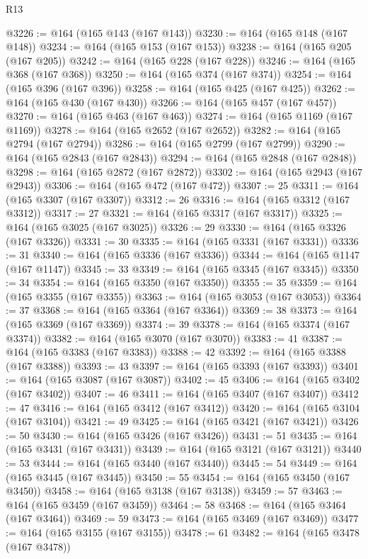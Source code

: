 \begin{lexlean}{R13}
\begin{coremodule}
@3226 := @164 (@165 @143 (@167 @143))
@3230 := @164 (@165 @148 (@167 @148))
@3234 := @164 (@165 @153 (@167 @153))
@3238 := @164 (@165 @205 (@167 @205))
@3242 := @164 (@165 @228 (@167 @228))
@3246 := @164 (@165 @368 (@167 @368))
@3250 := @164 (@165 @374 (@167 @374))
@3254 := @164 (@165 @396 (@167 @396))
@3258 := @164 (@165 @425 (@167 @425))
@3262 := @164 (@165 @430 (@167 @430))
@3266 := @164 (@165 @457 (@167 @457))
@3270 := @164 (@165 @463 (@167 @463))
@3274 := @164 (@165 @1169 (@167 @1169))
@3278 := @164 (@165 @2652 (@167 @2652))
@3282 := @164 (@165 @2794 (@167 @2794))
@3286 := @164 (@165 @2799 (@167 @2799))
@3290 := @164 (@165 @2843 (@167 @2843))
@3294 := @164 (@165 @2848 (@167 @2848))
@3298 := @164 (@165 @2872 (@167 @2872))
@3302 := @164 (@165 @2943 (@167 @2943))
@3306 := @164 (@165 @472 (@167 @472))
@3307 := 25
@3311 := @164 (@165 @3307 (@167 @3307))
@3312 := 26
@3316 := @164 (@165 @3312 (@167 @3312))
@3317 := 27
@3321 := @164 (@165 @3317 (@167 @3317))
@3325 := @164 (@165 @3025 (@167 @3025))
@3326 := 29
@3330 := @164 (@165 @3326 (@167 @3326))
@3331 := 30
@3335 := @164 (@165 @3331 (@167 @3331))
@3336 := 31
@3340 := @164 (@165 @3336 (@167 @3336))
@3344 := @164 (@165 @1147 (@167 @1147))
@3345 := 33
@3349 := @164 (@165 @3345 (@167 @3345))
@3350 := 34
@3354 := @164 (@165 @3350 (@167 @3350))
@3355 := 35
@3359 := @164 (@165 @3355 (@167 @3355))
@3363 := @164 (@165 @3053 (@167 @3053))
@3364 := 37
@3368 := @164 (@165 @3364 (@167 @3364))
@3369 := 38
@3373 := @164 (@165 @3369 (@167 @3369))
@3374 := 39
@3378 := @164 (@165 @3374 (@167 @3374))
@3382 := @164 (@165 @3070 (@167 @3070))
@3383 := 41
@3387 := @164 (@165 @3383 (@167 @3383))
@3388 := 42
@3392 := @164 (@165 @3388 (@167 @3388))
@3393 := 43
@3397 := @164 (@165 @3393 (@167 @3393))
@3401 := @164 (@165 @3087 (@167 @3087))
@3402 := 45
@3406 := @164 (@165 @3402 (@167 @3402))
@3407 := 46
@3411 := @164 (@165 @3407 (@167 @3407))
@3412 := 47
@3416 := @164 (@165 @3412 (@167 @3412))
@3420 := @164 (@165 @3104 (@167 @3104))
@3421 := 49
@3425 := @164 (@165 @3421 (@167 @3421))
@3426 := 50
@3430 := @164 (@165 @3426 (@167 @3426))
@3431 := 51
@3435 := @164 (@165 @3431 (@167 @3431))
@3439 := @164 (@165 @3121 (@167 @3121))
@3440 := 53
@3444 := @164 (@165 @3440 (@167 @3440))
@3445 := 54
@3449 := @164 (@165 @3445 (@167 @3445))
@3450 := 55
@3454 := @164 (@165 @3450 (@167 @3450))
@3458 := @164 (@165 @3138 (@167 @3138))
@3459 := 57
@3463 := @164 (@165 @3459 (@167 @3459))
@3464 := 58
@3468 := @164 (@165 @3464 (@167 @3464))
@3469 := 59
@3473 := @164 (@165 @3469 (@167 @3469))
@3477 := @164 (@165 @3155 (@167 @3155))
@3478 := 61
@3482 := @164 (@165 @3478 (@167 @3478))

\end{coremodule}
\end{lexlean}

